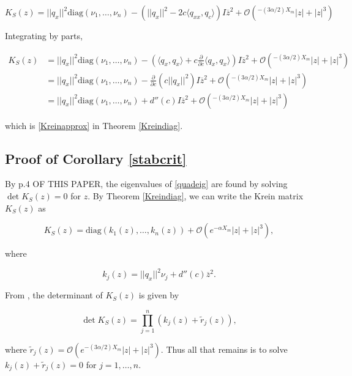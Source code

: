 \documentclass[12pt]{article}
\begin{document}
\begin{equation}\label{Kreinform2}
K_S(z) = ||q_x||^2 \text{diag}(\nu_1, \dots, \nu_n) 
- ( ||q_x||^2 -2 c \langle q_{xx}, q_c \rangle) I \overline{z}^2  + \mathcal{O}(^{-(3 \alpha/2) X_m}|z| + |z|^3)
\end{equation}

Integrating by parts,

\begin{align*}
K_S(z)
&= ||q_x||^2 \text{diag}(\nu_1, \dots, \nu_n) - \left( \langle q_x, q_x \rangle + c \frac{\partial}{\partial c}\langle q_x, q_x \rangle \right)I\overline{z}^2 + \mathcal{O}(^{-(3 \alpha/2) X_m}|z| + |z|^3)  \\
&= ||q_x||^2 \text{diag}(\nu_1, \dots, \nu_n) -\frac{\partial}{\partial c} \left( c||q_x||^2 \right) I \overline{z}^2  + \mathcal{O}(^{-(3 \alpha/2) X_m}|z| + |z|^3) \\
&= ||q_x||^2 \text{diag}(\nu_1, \dots, \nu_n) + d''(c) I \overline{z}^2  + \mathcal{O}(^{-(3 \alpha/2) X_m}|z| + |z|^3)
\end{align*}

which is \eqref{Kreinapprox} in Theorem \ref{Kreindiag}.

\subsection{Proof of Corollary \ref{stabcrit}}

By p.4 OF THIS PAPER, the eigenvalues of \eqref{quadeig} are found by solving $\det K_S(z) = 0$ for $z$. By Theorem \ref{Kreindiag}, we can write the Krein matrix $K_S(z)$ as 

\begin{equation}
K_S(z) = \text{diag}(k_1(z), \dots, k_n(z)) + \mathcal{O}(e^{-\alpha X_m}|z| + |z|^3),
\end{equation}

where

\begin{equation}
k_j(z) = ||q_x||^2 \nu_j + d''(c) \overline{z}^2.
\end{equation}

From \cite{Ipsen2008}, the determinant of $K_S(z)$ is given by

\begin{equation}\label{detK}
\det K_S(z) = \prod_{j = 1}^n (k_j(z) + \tilde{r}_j(z)),
\end{equation}

where $\tilde{r}_j(z) = \mathcal{O}(e^{-(3 \alpha/2) X_m}|z| + |z|^3)$. Thus all that remains is to solve $k_j(z) + \tilde{r}_j(z) = 0$ for $j = 1, \dots, n$.\\
\end{document}
